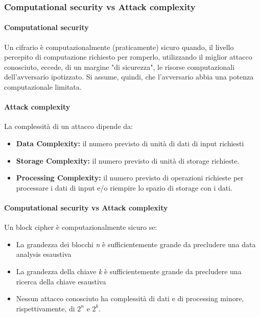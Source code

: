 \documentclass[a4paper,12pt]{article}
\begin{document}
\subsubsection{Computational security vs Attack complexity}
\paragraph{Computational security}
Un cifrario è computazionalmente (praticamente) sicuro quando, il livello percepito di computazione richiesto per romperlo, utilizzando il miglior attacco conosciuto, eccede, di un margine "di sicurezza", le risorse computazionali dell'avversario ipotizzato.
Si assume, quindi, che l'avversario abbia una potenza computazionale limitata.
\paragraph{Attack complexity}
La complessità di un attacco dipende da:
\begin{itemize}
	\item \textbf{Data Complexity:} il numero previsto di unità di dati di input richiesti
	\item \textbf{Storage Complexity:} il numero previsto di unità di storage richieste.
	\item \textbf{Processing Complexity:} il numero previsto di operazioni richieste per processare i dati di input e/o riempire lo spazio di storage con i dati.
\end{itemize}
\paragraph{Computational security vs Attack complexity} Un block cipher è computazionalmente sicuro se:
\begin{itemize}
	\item La grandezza dei blocchi \textit{n} è sufficientemente grande da precludere una data analysis esaustiva 
	\item La grandezza della chiave \textit{k} è sufficientemente grande da precludere una ricerca della chiave esaustiva
	\item Nessun attacco conosciuto ha complessità di dati e di processing minore, rispettivamente, di $2^n$ e $2^k$.
\end{itemize}
\end{document}
